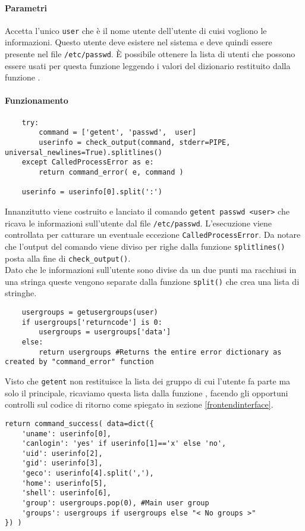 \documentclass[11pt]{article}
\begin{document}
\paragraph{Parametri}
Accetta l'unico \texttt{user} che è il nome utente dell'utente di cuisi vogliono le informazioni. Questo utente deve esistere nel sistema e deve
quindi essere presente nel file \texttt{/etc/passwd}. È possibile ottenere la lista di utenti che possono essere usati per questa funzione
leggendo i valori del dizionario restituito dalla funzione .
\paragraph{Funzionamento}
\begin{lstlisting}
    try:
        command = ['getent', 'passwd',  user]
        userinfo = check_output(command, stderr=PIPE, universal_newlines=True).splitlines()
    except CalledProcessError as e:
        return command_error( e, command )

	userinfo = userinfo[0].split(':')
\end{lstlisting}
Innanzitutto viene costruito e lanciato il comando \texttt{getent passwd <user>} che ricava le informazioni sull'utente dal file \texttt{/etc/passwd}.
L'esecuzione viene controllata per catturare un eventuale eccezione \texttt{CalledProcessError}. Da notare che l'output del comando viene diviso per righe
dalla funzione \texttt{splitlines()} posta alla fine di \texttt{check\_output()}.\\
Dato che le informazioni sull'utente sono divise da un due punti ma racchiusi in una stringa queste vengono separate dalla funzione \texttt{split()}
che crea una lista di stringhe.
\begin{lstlisting}
    usergroups = getusergroups(user)
    if usergroups['returncode'] is 0:
        usergroups = usergroups['data']
    else:
        return usergroups #Returns the entire error dictionary as created by "command_error" function
\end{lstlisting}
Visto che \texttt{getent} non restituisce la lista dei gruppo di cui l'utente fa parte ma solo il principale, ricaviamo questa lista
dalla funzione , facendo gli opportuni controlli sul codice di ritorno come spiegato in sezione \ref{frontendinterface}.
\begin{lstlisting}
return command_success( data=dict({
	'uname': userinfo[0],
	'canlogin': 'yes' if userinfo[1]=='x' else 'no',
	'uid': userinfo[2],
	'gid': userinfo[3],
	'geco': userinfo[4].split(','),
	'home': userinfo[5],
	'shell': userinfo[6],
	'group': usergroups.pop(0), #Main user group
	'groups': usergroups if usergroups else "< No groups >"
}) )
\end{lstlisting}
\end{document}
